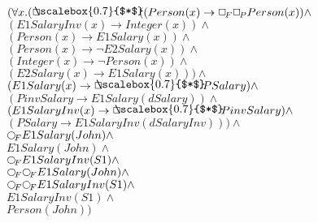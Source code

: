 \documentclass[a4paper,10pt]{article}
\begin{document}
 \newcommand{\nxt}{{\ensuremath\raisebox{0.25ex}{\text{\scriptsize$\bigcirc$}}}}
\newcommand{\Rdiamond}{\Diamond_{\!F}}
\newcommand{\Rbox}{\Box_{\!F}}
\newcommand{\Rnext}{\nxt_{\!F}}
\newcommand{\Ldiamond}{\Diamond_{\!P}}
\newcommand{\Lbox}{\Box_{\!P}}
\newcommand{\Lnext}{\nxt_{\!P}}
\newcommand{\SVdiamond}{\mathop{\ooalign{$\Diamond$ \cr \kern0.5ex
    \raisebox{0.35ex}{\scalebox{0.7}{$*$}}} \kern-0.9ex}}
\newcommand{\SVbox}{\mathop{\ooalign{$\Box$ \cr \kern0.42ex
    \raisebox{0.3ex}{\scalebox{0.7}{$*$}}} \kern-0.9ex}}


$( \forall x. ( \SVbox ((Person(x) \rightarrow  \Rbox  \Lbox Person(x)) \land $ \\ 
 $ (E1SalaryInv(x) \rightarrow Integer(x)) \land $ \\ 
 $ (Person(x) \rightarrow E1Salary(x)) \land $ \\ 
 $ (Person(x) \rightarrow  \lnot E2Salary(x)) \land $ \\ 
 $ (Integer(x) \rightarrow  \lnot Person(x)) \land $ \\ 
 $ (E2Salary(x) \rightarrow E1Salary(x))) \land $ \\ 
 $ (E1Salary(x) \rightarrow  \SVbox PSalary) \land $ \\ 
 $ (PinvSalary \rightarrow E1Salary(dSalary)) \land $ \\ 
 $ (E1SalaryInv(x) \rightarrow  \SVbox PinvSalary) \land $ \\ 
 $ (PSalary \rightarrow E1SalaryInv(dSalaryInv))) \land $ \\ 
 $  \Rnext E1Salary(John) \land $ \\ 
 $ E1Salary(John) \land $ \\ 
 $  \Rnext E1SalaryInv(S1) \land $ \\ 
 $  \Rnext  \Rnext E1Salary(John) \land $ \\ 
 $  \Rnext  \Rnext E1SalaryInv(S1) \land $ \\ 
 $ E1SalaryInv(S1) \land $ \\ 
 $ Person(John))$ 
\end{document}
